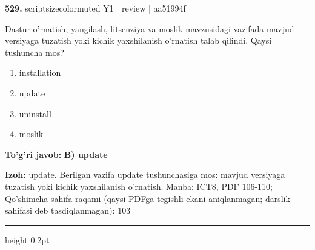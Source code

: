 \documentclass[10pt,a4paper]{article}
\begin{document}
{\bfseries\sffamily\color{ink} 529.} {scriptsizecolor{muted} Y1 | review | aa51994f}
\par
Dastur o'rnatish, yangilash, litsenziya va moslik mavzusidagi vazifada mavjud versiyaga tuzatish yoki kichik yaxshilanish o'rnatish talab qilindi. Qaysi tushuncha mos?
\begin{enumerate}[label=\Alph*),leftmargin=9mm]
\item installation
\item update
\item uninstall
\item moslik
\end{enumerate}
\begin{tcolorbox}[enhanced,breakable,colback=teal!4,colframe=teal!60!black,boxrule=0.45pt,arc=1.2mm,left=2.7mm,right=2.7mm,top=1.8mm,bottom=1.8mm,before skip=2mm,after skip=2mm]
{\bfseries\sffamily\color{teal}To'g'ri javob:} \textbf{B) update}
\par\smallskip
{\bfseries Izoh:} update. Berilgan vazifa update tushunchasiga mos: mavjud versiyaga tuzatish yoki kichik yaxshilanish o'rnatish. Manba: ICT8, PDF 106-110; Qo'shimcha sahifa raqami (qaysi PDFga tegishli ekani aniqlanmagan; darslik sahifasi deb tasdiqlanmagan): 103
\end{tcolorbox}
\vspace{2mm}\hrule height 0.2pt\vspace{3mm}
\end{document}
